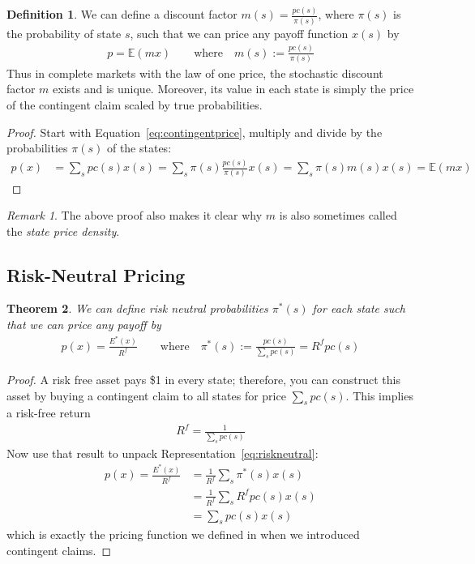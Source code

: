 \documentclass[12pt]{article}
\theoremstyle{plain}
\newtheorem{thm}{Theorem}[section]
\theoremstyle{definition}
\newtheorem{defn}[thm]{Definition}
\theoremstyle{remark}
\newtheorem*{rmk}{Remark}
\begin{document}
\begin{defn}
We can define a discount factor $m(s) = \frac{pc(s)}{\pi(s)}$, where
$\pi(s)$ is the probability of state $s$, such that we can price any
payoff function $x(s)$ by
\begin{align}
  p = \mathbb{E}(mx)
  \qquad \text{where}
  \quad m(s) := \frac{pc(s)}{\pi(s)}
  \label{eq:contingent}
\end{align}
Thus in complete markets with the law of one price, the stochastic
discount factor $m$ exists and is unique. Moreover, its value in each
state is simply the price of the contingent claim scaled by true
probabilities.
\end{defn}
\begin{proof}
Start with Equation~\ref{eq:contingentprice}, multiply and divide by the
probabilities $\pi(s)$ of the states:
\begin{align*}
  p(x) &= \sum_s pc(s) x(s)
  = \sum_s \pi(s) \frac{pc(s)}{\pi(s)} x(s)
  = \sum_s \pi(s) m(s) x(s)
  = \mathbb{E}(mx)
\end{align*}
\end{proof}
\begin{rmk}
The above proof also makes it clear why $m$ is also sometimes called the
\emph{state price density}.
\end{rmk}

\subsection{Risk-Neutral Pricing}

\begin{thm}
We can define risk neutral probabilities $\pi^*(s)$ for each state such
that we can price any payoff by
\begin{align}
  p(x) =\frac{E^*(x)}{R^f}
  \qquad
  \text{where}\quad
  \pi^*(s) := \frac{pc(s)}{\sum_s pc(s)}
  = R^f pc(s)
  \label{eq:riskneutral}
\end{align}
\end{thm}
\begin{proof}
A risk free asset pays \$1 in every state; therefore, you can construct
this asset by buying a contingent claim to all states for price $\sum_s
pc(s)$. This implies a risk-free return
\begin{align*}
  R^f = \frac{1}{\sum_s pc(s)}
\end{align*}
Now use that result to unpack Representation~\ref{eq:riskneutral}:
\begin{align*}
  p(x) = \frac{E^*(x)}{R^f}
  &= \frac{1}{R^f} \sum_s \pi^*(s) x(s) \\
  &= \frac{1}{R^f} \sum_s R^f pc(s) x(s) \\
  &= \sum_s pc(s) x(s)
\end{align*}
which is exactly the pricing function we defined in when we introduced
contingent claims.
\end{proof}
\end{document}
